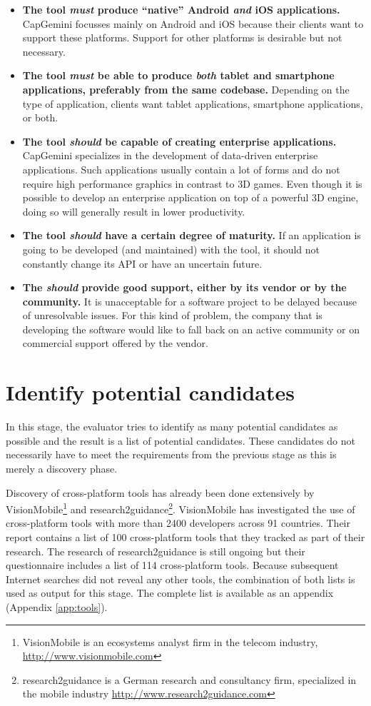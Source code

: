 \begin{itemize}
    \item \textbf{The tool \emph{must} produce ``native'' Android \emph{and} iOS applications.} CapGemini focusses mainly on Android and iOS because their clients want to support these platforms. Support for other platforms is desirable but not necessary.
    \item \textbf{The tool \emph{must} be able to produce \emph{both} tablet and smartphone applications, preferably from the same codebase.} Depending on the type of application, clients want tablet applications, smartphone applications, or both.
    \item \textbf{The tool \emph{should} be capable of creating enterprise applications.} CapGemini specializes in the development of data-driven enterprise applications. Such applications usually contain a lot of forms and do not require high performance graphics in contrast to 3D games. Even though it is possible to develop an enterprise application on top of a powerful 3D engine, doing so will generally result in lower productivity.
    \item \textbf{The tool \emph{should} have a certain degree of maturity.} If an application is going to be developed (and maintained) with the tool, it should not constantly change its API or have an uncertain future. 
    \item \textbf{The \emph{should} provide good support, either by its vendor or by the community.} It is unacceptable for a software project to be delayed because of unresolvable issues. For this kind of problem, the company that is developing the software would like to fall back on an active community or on commercial support offered by the vendor.
\end{itemize}

\section{Identify potential candidates}

In this stage, the evaluator tries to identify as many potential candidates as possible and the result is a list of potential candidates. These candidates do not necessarily have to meet the requirements from the previous stage as this is merely a discovery phase.

Discovery of cross-platform tools has already been done extensively by VisionMobile\footnote{VisionMobile is an ecosystems analyst firm in the telecom industry, \url{http://www.visionmobile.com}} \cite{VMCPT:2012} and \mbox{research2guidance}\footnote{research2guidance is a German research and consultancy firm, specialized in the mobile industry \url{http://www.research2guidance.com}}. VisionMobile has investigated the use of cross-platform tools with more than 2400 developers across 91 countries. Their report contains a list of 100 cross-platform tools that they tracked as part of their research. The research of \mbox{research2guidance} is still ongoing but their questionnaire includes a list of 114 cross-platform tools. Because subsequent Internet searches did not reveal any other tools, the combination of both lists is used as output for this stage. The complete list is available as an appendix (Appendix \ref{app:tools}).

